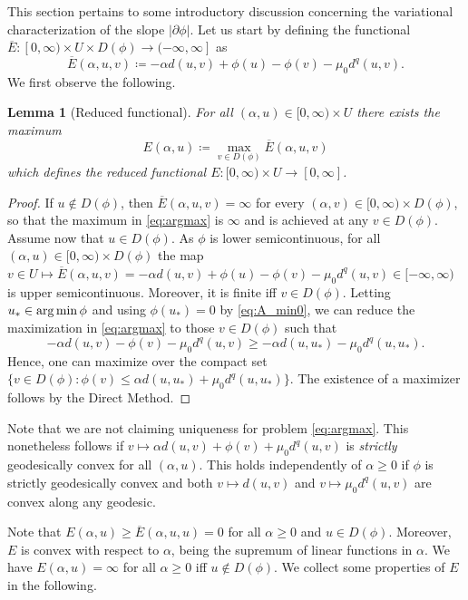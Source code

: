 \documentclass[reqno]{amsart}
\newcommand{\ove}{\overline}
\DeclareMathOperator*{\argmin}{{\rm arg\,min}}
\renewcommand{\sl}{|\partial \phi|}
\newtheorem{lemma}[theorem]{Lemma}
\begin{document}
This section pertains to some introductory discussion concerning
the variational characterization of the slope $\sl$.
Let us start by defining the functional $\ove E: [0,\infty) \times U \times
D(\phi) \to (-\infty,\infty]$ as
\begin{equation*}
    \ove E(\alpha,u,v) \coloneqq -\alpha d(u,v) + \phi(u) -\phi(v)- \mu_0
 d^q(u,v).
\end{equation*}
We  first  observe the following.
\begin{lemma}[Reduced functional]\label{lemma:v}
  For all $(\alpha,u)\in [0,\infty)\times U$  there exists the maximum   \begin{equation}
  E(\alpha,u) \coloneqq   \max_{ v\in D(\phi)}   \ove
 E(\alpha,u,v) \label{eq:argmax}
\end{equation}
 which  defines the reduced functional $E : [0,\infty)\times U
 \to [0,\infty]$. 
\end{lemma}
\begin{proof}   If $u \notin D(\phi)$, then $\ove E(\alpha, u, v)=\infty$ for every $(\alpha, v) \in [0,\infty) \times D(\phi)$, so that the  maximum  in \eqref{eq:argmax} is $\infty$ and  is  achieved at any $v \in D(\phi)$.  Assume now that   $u \in D(\phi)$.
  As $\phi$ is
  lower semicontinuous,  for all $(\alpha,u)   \in [0,\infty) \times D(\phi)  $  the map $ v \in U
  \mapsto  \ove E(\alpha,u,v) = -\alpha d(u, v)+\phi(u)
  -\phi( v)  - \mu_0 d^q(u, v) \in [-\infty,\infty)$ is upper
  semicontinuous. Moreover, it is 
  finite iff $  v \in D(\phi)$. Letting $u_*\in \argmin \phi$ and using $\phi(u_*)=0$ by \eqref{eq:A_min0}, we can reduce the
  maximization  in \eqref{eq:argmax}  to those $ v\in D(\phi)$ such that $$-\alpha d(u, v)
  -\phi( v) - \mu_0  d^q(u, v)\geq -\alpha d(u,u_*)
  - \mu_0  d^q(u,u_*).$$
 Hence, one can maximize 
    over
  the compact set $\{ v \in D(\phi):\phi( v) \leq \alpha
  d(u,u_*) +{ \mu_0  }d^q(u,u_*)  \}$. The existence of a maximizer  follows by the Direct Method.
\end{proof}

Note that we are not claiming uniqueness for problem
\eqref{eq:argmax}. This nonetheless follows if $v \mapsto \alpha
d(u,v)+\phi(v) +  \mu_0  d^q(u,v)$ is {\it strictly} geodesically
convex for all $(\alpha,u)$. This holds independently of $\alpha
\geq 0$ if $\phi$ is
strictly geodesically convex and both $v\mapsto d(u,v)$ and $v\mapsto
 \mu_0  d^q(u,v)$ are 
convex along any geodesic. 

  Note that $ E(\alpha,u) \geq \ove E(\alpha,u,u)=0$  for all $\alpha\geq 0$ and
  $u \in  D(\phi)$. Moreover, $ E$ is convex with respect to $\alpha$, being the supremum of linear
  functions in $\alpha$. We have $ E(\alpha,u)=\infty$ for all $\alpha\geq
  0$ iff $u \not \in D(\phi)$. We collect some properties of $ E$ in the following.
\end{document}
